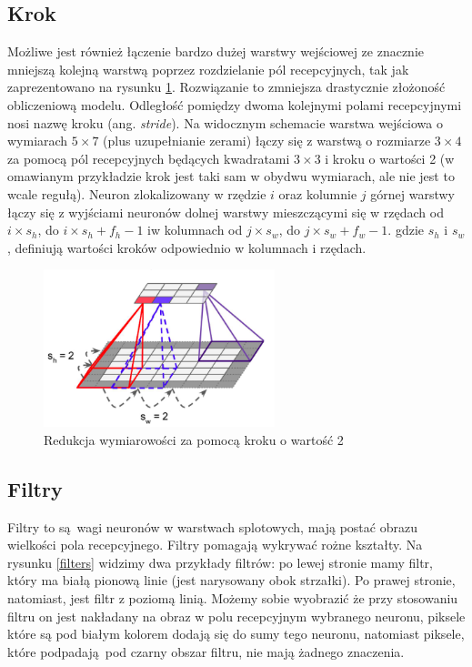 \documentclass{article}
\begin{document}
\subsection{Krok}
Możliwe jest również łączenie bardzo dużej warstwy wejściowej ze znacznie mniejszą kolejną warstwą poprzez rozdzielanie pól recepcyjnych, tak jak zaprezentowano na rysunku \ref{step}. Rozwiązanie to zmniejsza drastycznie złożoność obliczeniową modelu. Odległość pomiędzy dwoma kolejnymi polami recepcyjnymi nosi nazwę kroku (ang. \textit{stride}). Na widocznym schemacie warstwa wejściowa o wymiarach $5 \times 7$ (plus uzupełnianie zerami) łączy się z warstwą o rozmiarze $3 \times 4$ za pomocą pól recepcyjnych będących kwadratami $3 \times 3$ i kroku o wartości 2 (w omawianym przykładzie krok jest taki sam w obydwu wymiarach, ale nie jest to wcale regułą). Neuron zlokalizowany w rzędzie $i$ oraz kolumnie $j$ górnej warstwy łączy się z wyjściami neuronów dolnej warstwy mieszczącymi się w rzędach od $i\times s_{h}$, do $i \times s_{h}+f_{h}-1$ iw kolumnach od $j \times s_{w}$, do $j \times s_{w}+f_{w}-1$. gdzie $s_{h}$ i $s_{w}$, definiują wartości kroków odpowiednio w kolumnach i rzędach. \cite{geron}
\begin{figure}[H]
	\centering
	\includegraphics[width=0.6\textwidth,keepaspectratio=true]{step}
	\caption{Redukcja wymiarowości za pomocą kroku o wartość 2 \cite{geron}}
	\label{step}
\end{figure}


\subsection{Filtry}
Filtry to są wagi neuronów w warstwach splotowych, mają postać obrazu wielkości pola recepcyjnego. Filtry pomagają wykrywać rożne kształty. Na rysunku \ref{filters} widzimy dwa przykłady filtrów: po lewej stronie mamy filtr, który ma białą pionową linie (jest narysowany obok strzałki). Po prawej stronie, natomiast, jest filtr z poziomą linią. Możemy sobie wyobrazić że przy stosowaniu filtru on jest nakładany na obraz w polu recepcyjnym wybranego neuronu, piksele które są pod białym kolorem dodają się do sumy tego neuronu, natomiast piksele, które podpadają pod czarny obszar filtru, nie mają żadnego znaczenia. 
\end{document}
